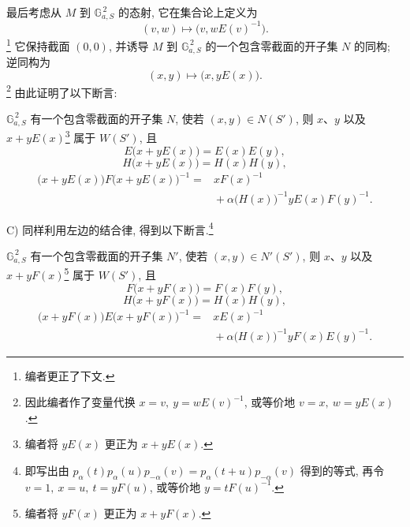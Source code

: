 最后考虑从 \(M\) 到 \(\mathbb G_{a,S}^{\,2}\) 的态射, 它在集合论上定义为
\[
  (v,w)\longmapsto\bigl(v,wE(v)^{-1}\bigr).
\]
\footnote{编者更正了下文.}
它保持截面 \((0,0)\), 并诱导 \(M\) 到 \(\mathbb G_{a,S}^{\,2}\) 的一个包含零截面的开子集 \(N\) 的同构; 逆同构为
\[
  (x,y)\longmapsto\bigl(x,yE(x)\bigr).
\]
\footnote{因此编者作了变量代换 \(x=v,\ y=wE(v)^{-1}\), 或等价地 \(v=x,\ w=yE(x)\).}
由此证明了以下断言:

\(\mathbb G_{a,S}^{\,2}\) 有一个包含零截面的开子集 \(N\), 使若 \((x,y)\in N(S')\), 则 \(x\)、\(y\) 以及 \(x+yE(x)\)\footnote{编者将 \(yE(x)\) 更正为 \(x+yE(x)\).} 属于 \(W(S')\), 且
\begin{equation}\tag{1''}
  E\bigl(x+yE(x)\bigr)=E(x)E(y),
\end{equation}
\begin{equation}\tag{2''}
  H\bigl(x+yE(x)\bigr)=H(x)H(y),
\end{equation}
\begin{equation}\tag{3''}
\begin{split}
  \bigl(x+yE(x)\bigr)F\bigl(x+yE(x)\bigr)^{-1}
   ={}&xF(x)^{-1}\\
     &{}+\alpha\bigl(H(x)\bigr)^{-1}yE(x)F(y)^{-1}.
\end{split}
\end{equation}

\textup{C)} 同样利用左边的结合律, 得到以下断言.\footnote{即写出由 \(p_\alpha(t)p_\alpha(u)p_{-\alpha}(v)=p_\alpha(t+u)p_{-\alpha}(v)\) 得到的等式, 再令 \(v=1,\ x=u,\ t=yF(u)\), 或等价地 \(y=tF(u)^{-1}\).}

\(\mathbb G_{a,S}^{\,2}\) 有一个包含零截面的开子集 \(N'\), 使若 \((x,y)\in N'(S')\), 则 \(x\)、\(y\) 以及 \(x+yF(x)\)\footnote{编者将 \(yF(x)\) 更正为 \(x+yF(x)\).} 属于 \(W(S')\), 且
\begin{equation}\tag{4''}
  F\bigl(x+yF(x)\bigr)=F(x)F(y),
\end{equation}
\begin{equation}\tag{5''}
  H\bigl(x+yF(x)\bigr)=H(x)H(y),
\end{equation}
\begin{equation}\tag{6''}
\begin{split}
  \bigl(x+yF(x)\bigr)E\bigl(x+yF(x)\bigr)^{-1}
   ={}&xE(x)^{-1}\\
     &{}+\alpha\bigl(H(x)\bigr)^{-1}yF(x)E(y)^{-1}.
\end{split}
\end{equation}

